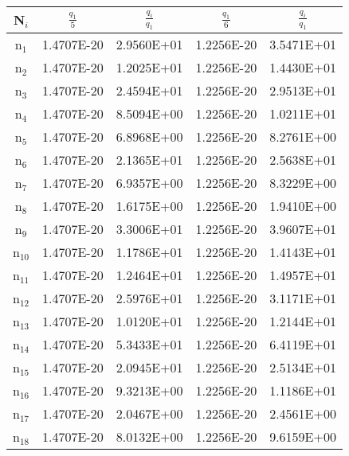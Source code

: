 \documentclass{article}
\begin{document}
\begin{enumerate}
\begin{table}[h!]
    \centering
    \begin{tabular}{|c|c|c|c|c|}
    \hline
       N$_{i}$  & $\frac{q_{1}}{5}$ & $\frac{q_{i}}{q_{1}}$ & $\frac{q_{1}}{6}$ & $\frac{q_{i}}{q_{1}}$\\
       \hline
       n$_{1}$  & 1.4707E-20 & 2.9560E+01 & 1.2256E-20 & 3.5471E+01\\
       \hline
       n$_{2}$  & 1.4707E-20 & 1.2025E+01 & 1.2256E-20 & 1.4430E+01\\
       \hline       
       n$_{3}$  & 1.4707E-20 & 2.4594E+01 & 1.2256E-20 & 2.9513E+01\\
       \hline       
       n$_{4}$  & 1.4707E-20 & 8.5094E+00 & 1.2256E-20 & 1.0211E+01\\
       \hline       
       n$_{5}$  & 1.4707E-20 & 6.8968E+00 & 1.2256E-20 & 8.2761E+00\\
       \hline       
       n$_{6}$  & 1.4707E-20 & 2.1365E+01 & 1.2256E-20 & 2.5638E+01\\
       \hline       
       n$_{7}$  & 1.4707E-20 & 6.9357E+00 & 1.2256E-20 & 8.3229E+00\\
       \hline       
       n$_{8}$  & 1.4707E-20 & 1.6175E+00 & 1.2256E-20 & 1.9410E+00\\
       \hline       
       n$_{9}$  & 1.4707E-20 & 3.3006E+01 & 1.2256E-20 & 3.9607E+01\\
       \hline       
       n$_{10}$  & 1.4707E-20 & 1.1786E+01 & 1.2256E-20 & 1.4143E+01\\
       \hline       
       n$_{11}$  & 1.4707E-20 & 1.2464E+01 & 1.2256E-20 & 1.4957E+01\\
       \hline       
       n$_{12}$  & 1.4707E-20 & 2.5976E+01 & 1.2256E-20 & 3.1171E+01\\
       \hline       
       n$_{13}$  & 1.4707E-20 & 1.0120E+01 & 1.2256E-20 & 1.2144E+01\\
       \hline       
       n$_{14}$  & 1.4707E-20 & 5.3433E+01 & 1.2256E-20 & 6.4119E+01\\
       \hline
       n$_{15}$  & 1.4707E-20 & 2.0945E+01 & 1.2256E-20 & 2.5134E+01\\
       \hline       
       n$_{16}$  & 1.4707E-20 & 9.3213E+00 & 1.2256E-20 & 1.1186E+01\\
       \hline       
       n$_{17}$  & 1.4707E-20 & 2.0467E+00 & 1.2256E-20 & 2.4561E+00\\
       \hline       
       n$_{18}$  & 1.4707E-20 & 8.0132E+00 & 1.2256E-20 & 9.6159E+00\\

\end{tabular}
\end{table}
\end{enumerate}
\end{document}
